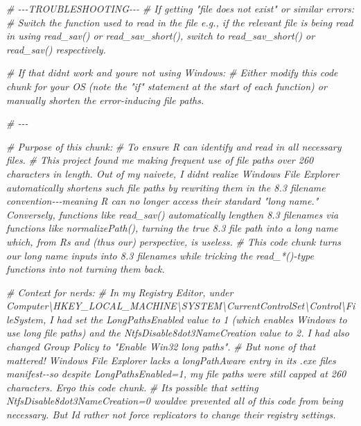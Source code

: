 \documentclass[
]{article}
\newenvironment{Shaded}{\begin{snugshade}}{\end{snugshade}}
\newcommand{\CommentTok}[1]{\textcolor[rgb]{0.56,0.35,0.01}{\textit{#1}}}
\newcounter{none} %
\begin{document}
\begin{Shaded}
\begin{Highlighting}[]
\CommentTok{\# {-}{-}{-}TROUBLESHOOTING{-}{-}{-}}
\CommentTok{\# If getting "file does not exist" or similar errors:}
\CommentTok{\# Switch the function used to read in the file e.g., if the relevant file is being read in using read\_sav() or read\_sav\_short(), switch to read\_sav\_short() or read\_sav() respectively.}

\CommentTok{\# If that didn\textquotesingle{}t work and you\textquotesingle{}re not using Windows: }
\CommentTok{\# Either modify this code chunk for your OS (note the "if" statement at the start of each function) or manually shorten the error{-}inducing file paths.}

\CommentTok{\# {-}{-}{-}}

\CommentTok{\# Purpose of this chunk: }
\CommentTok{\# To ensure R can identify and read in all necessary files.}
\CommentTok{\# This project found me making frequent use of file paths over 260 characters in length. Out of my naivete, I didn\textquotesingle{}t realize Windows File Explorer automatically shortens such file paths by rewriting them in the 8.3 filename convention{-}{-}{-}meaning R can no longer access their standard "long name." Conversely, functions like read\_sav() automatically lengthen 8.3 filenames via functions like normalizePath(), turning the true 8.3 file path into a long name which, from R\textquotesingle{}s and (thus our) perspective, is useless.}
\CommentTok{\# This code chunk turns our long name inputs into 8.3 filenames while tricking the read\_*(){-}type functions into not turning them back.}


\CommentTok{\# Context for nerds:}
\CommentTok{\# In my Registry Editor, under Computer\textbackslash{}HKEY\_LOCAL\_MACHINE\textbackslash{}SYSTEM\textbackslash{}CurrentControlSet\textbackslash{}Control\textbackslash{}FileSystem, I had set the LongPathsEnabled value to 1 (which enables Windows to use long file paths) and the NtfsDisable8dot3NameCreation value to 2. I had also changed Group Policy to "Enable Win32 long paths".}
\CommentTok{\# But none of that mattered! Windows File Explorer lacks a longPathAware entry in its .exe file\textquotesingle{}s manifest{-}{-}so despite LongPathsEnabled=1, my file paths were still capped at 260 characters. Ergo this code chunk.}
\CommentTok{\# It\textquotesingle{}s possible that setting NtfsDisable8dot3NameCreation=0 would\textquotesingle{}ve prevented all of this code from being necessary. But I\textquotesingle{}d rather not force replicators to change their registry settings.}


\end{Highlighting}
\end{Shaded}
\end{document}
